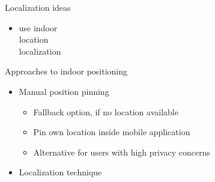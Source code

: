 \documentclass[11pt]{beamer}
\begin{document}
\begin{frame}{Localization ideas}
\begin{center}
{\begin{minipage}[b]{0.45\linewidth}
\begin{minipage}[b]{0.45\linewidth}
            \end{minipage}%
            \begin{minipage}[b]{0.75\linewidth}
                \begin{itemize}
                    \item use indoor \\location \\localization
                \end{itemize}
            \end{minipage}
        \end{minipage}
            }
\end{center}
    
\end{frame}

\begin{frame}{Approaches to indoor positioning}

	\begin{itemize}
	
		\item Manual position pinning
		\begin{itemize}
			\setlength{\itemsep}{0.2ex}
			\item Fallback option, if no location available
			\item Pin own location inside mobile application
			\item Alternative for users with high privacy concerns
		\end{itemize}
		
		\item Localization technique
	
	\end{itemize}
	

\end{frame}
\end{document}
